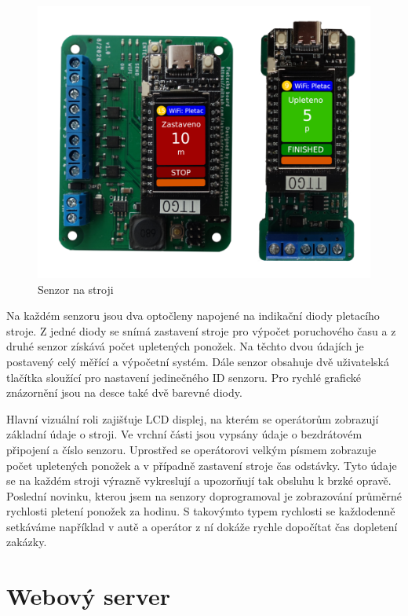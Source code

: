 \documentclass{template/socthesis}
\begin{document}
\begin{figure}[htbp]
    \centering
    \includegraphics[width=\textwidth]{img/oba.png}
    \caption{Senzor na stroji}
    \label{fig:SenzorNaStroji}
\end{figure}

Na každém senzoru jsou dva optočleny napojené na indikační diody pletacího stroje.
Z jedné diody se snímá zastavení stroje pro výpočet poruchového času a z druhé senzor získává počet upletených ponožek.
Na těchto dvou údajích je postavený celý měřící a výpočetní systém.
Dále senzor obsahuje dvě uživatelská tlačítka sloužící pro nastavení jedinečného ID senzoru.
Pro rychlé grafické znázornění jsou na desce také dvě barevné diody.

Hlavní vizuální roli zajišťuje LCD displej, na kterém se operátorům zobrazují základní údaje o stroji.
Ve vrchní části jsou vypsány údaje o bezdrátovém připojení a číslo senzoru.
Uprostřed se operátorovi velkým písmem zobrazuje počet upletených ponožek a v případně zastavení stroje čas odstávky.
Tyto údaje se na každém stroji výrazně vykreslují a upozorňují tak obsluhu k brzké opravě.
Poslední novinku, kterou jsem na senzory doprogramoval je zobrazování průměrné rychlosti pletení ponožek za hodinu.
S takovýmto typem rychlosti se každodenně setkáváme například v autě a operátor z ní dokáže rychle dopočítat čas dopletení zakázky. 


\section{Webový server}
\end{document}
